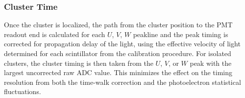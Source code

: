 \subsubsection {Cluster Time}

Once the cluster is localized, the path from the cluster position to the PMT readout end is calculated for each
$U$, $V$, $W$ peakline and the peak timing is corrected for propagation delay of the light, using the effective
velocity of light determined for each scintillator from the calibration procedure. For isolated clusters, the cluster
timing is then taken from the $U$, $V$, or $W$ peak with the largest uncorrected raw ADC value. This minimizes
the effect on the timing resolution from both the time-walk correction and the photoelectron statistical fluctuations.
